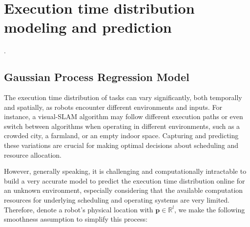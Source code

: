 
	\section{Execution time distribution modeling and prediction}
    \label{section_et_model_gp}
	
    .

    \subsection{Gaussian Process Regression Model}
    
    The execution time distribution of tasks can vary significantly, both temporally and spatially, as robots encounter different environments and inputs. For instance, a visual-SLAM algorithm may follow different execution paths or even switch between algorithms when operating in different environments, such as a crowded city, a farmland, or an empty indoor space. Capturing and predicting these variations are crucial for making optimal decisions about scheduling and resource allocation.

    However, generally speaking, it is challenging and computationally intractable to build a very accurate model to predict the execution time distribution online for an unknown environment, especially considering that the available computation resources for underlying scheduling and operating systems are very limited. Therefore, denote a robot's physical location with $\textbf{p}\in \mathbb{R}^l$,
    we make the following smoothness assumption to simplify this process:
    
